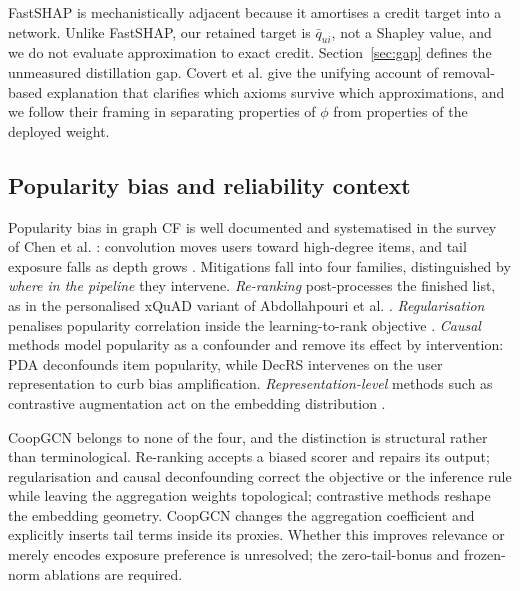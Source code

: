\documentclass[a4paper,fleqn,longmktitle]{cas-dc}
\begin{document}
FastSHAP \citep{jethani2022fastshap} is mechanistically adjacent because it
amortises a credit target into a network. Unlike FastSHAP, our retained target
is $\bar q_{ui}$, not a Shapley value, and we do not evaluate approximation to
exact credit. Section~\ref{sec:gap} defines the unmeasured distillation gap. Covert et
al. \citep{covert2021removing} give the unifying account of removal-based
explanation that clarifies which axioms survive which approximations, and we
follow their framing in separating properties of $\phi$ from properties of the
deployed weight.

\subsection{Popularity bias and reliability context}
\label{sec:rw-bias}

Popularity bias in graph CF is well documented and systematised in the survey
of Chen et al. \citep{chen2023biassurvey}: convolution moves users toward
high-degree items, and tail exposure falls as depth grows
\citep{xia2022hccf,cai2023lightgcl}. Mitigations fall into four families,
distinguished by \emph{where in the pipeline} they intervene.
\emph{Re-ranking} post-processes the finished list, as in the personalised
xQuAD variant of Abdollahpouri et al. \citep{abdollahpouri2019managing}.
\emph{Regularisation} penalises popularity correlation inside the
learning-to-rank objective \citep{abdollahpouri2017controlling}.
\emph{Causal} methods model popularity as a confounder and remove its effect
by intervention: PDA \citep{zhang2021pda} deconfounds item popularity, while
DecRS \citep{wang2021decrs} intervenes on the user representation to curb bias
amplification. \emph{Representation-level} methods such as contrastive
augmentation act on the embedding distribution \citep{yu2024xsimgcl}.

CoopGCN belongs to none of the four, and the distinction is structural rather
than terminological. Re-ranking accepts a biased scorer and repairs its
output; regularisation and causal deconfounding correct the objective or the
inference rule while leaving the aggregation weights topological; contrastive
methods reshape the embedding geometry. CoopGCN changes the aggregation coefficient and explicitly inserts tail terms
inside its proxies. Whether this improves relevance or merely encodes exposure
preference is unresolved; the zero-tail-bonus and frozen-norm ablations are
required.
\end{document}
